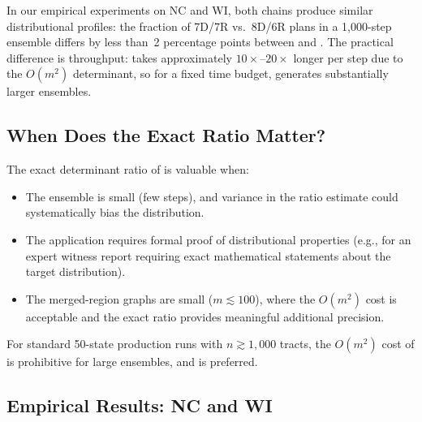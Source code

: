 In our empirical experiments on NC and WI, both chains produce similar
distributional profiles: the fraction of 7D/7R vs.\ 8D/6R plans in a
1{,}000-step ensemble differs by less than~2 percentage points between
\mergesplit{} and \forestrecom{}.
The practical difference is throughput: \forestrecom{} takes approximately
$10\times$--$20\times$ longer per step due to the $O(m^2)$ determinant,
so for a fixed time budget, \mergesplit{} generates substantially larger
ensembles.

\subsection{When Does the Exact Ratio Matter?}

The exact determinant ratio of \forestrecom{} is valuable when:
\begin{itemize}
  \item The ensemble is small (few steps), and variance in the ratio
        estimate could systematically bias the distribution.
  \item The application requires formal proof of distributional properties
        (e.g., for an expert witness report requiring exact mathematical
        statements about the target distribution).
  \item The merged-region graphs are small ($m \lesssim 100$), where the
        $O(m^2)$ cost is acceptable and the exact ratio provides meaningful
        additional precision.
\end{itemize}

For standard 50-state production runs with $n \gtrsim 1{,}000$ tracts,
the $O(m^2)$ cost of \forestrecom{} is prohibitive for large ensembles,
and \mergesplit{} is preferred.

\subsection{Empirical Results: NC and WI}

